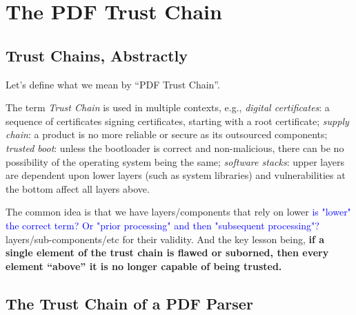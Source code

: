 \section{The PDF Trust Chain }
\label{sec:background} 
\label{sec:trust-chain}

\subsection{Trust Chains, Abstractly}

Let's define what we mean by ``PDF Trust Chain''.

The term \emph{Trust Chain} is used in multiple contexts, e.g.,
\emph{digital certificates}: a sequence of certificates signing certificates,
starting with a root certificate;
\emph{supply chain}: a product is no more reliable or secure as its
outsourced components;
\emph{trusted boot}: unless the bootloader is correct and non-malicious,
there can be no possibility of the operating system being the same;
\emph{software stacks}: upper layers are dependent upon lower layers (such as
system libraries) and vulnerabilities at the bottom affect all layers above.

The common idea is that we have layers/components that rely on lower
\textcolor{blue}{is "lower" the correct term? Or "prior processing" and then "subsequent processing"?}
layers/sub-components/etc for their validity.
And the key lesson being,
{\bf{if a single element of the trust chain 
  is flawed or suborned, then every element ``above'' it
  is no longer capable of being trusted.}}


\subsection{The Trust Chain of a PDF Parser}


